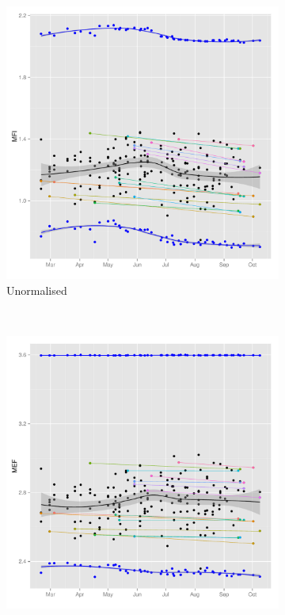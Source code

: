 \begin{figure}[ht]
\centering
\begin{subfigure}[b]{.4\textwidth}
    \centering
    \includegraphics[scale=.3]{figures/CD25-MFI-time-effect-repeatability.pdf}
    \caption{Unormalised}
\end{subfigure}
~
\begin{subfigure}[b]{.4\textwidth}
    \centering
    \includegraphics[scale=.3]{figures/CD25-MFI-time-effect-beads-normalised.pdf}

\end{subfigure}
\end{figure}
